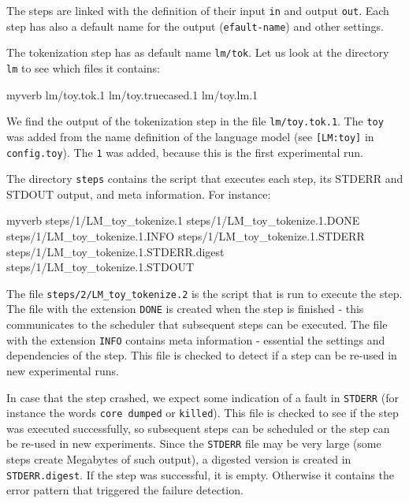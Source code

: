 The steps are linked with the definition of their input {\tt in} and output {\tt out}. Each step has also a default name for the output ({\tt efault-name}) and other settings.



The tokenization step has as default name {\tt lm/tok}. Let us look at the directory {\tt lm} to see which files it contains:






\begin{SaveVerbatim}{myverb}
 lm/toy.tok.1
 lm/toy.truecased.1
 lm/toy.lm.1
\end{SaveVerbatim}
\colorbox{gray}{%
}

We find the output of the tokenization step in the file {\tt lm/toy.tok.1}. The {\tt toy} was added from the name definition of the language model (see {\tt [LM:toy]} in {\tt config.toy}). The {\tt 1} was added, because this is the first experimental run.



The directory {\tt steps} contains the script that executes each step, its STDERR and STDOUT output, and meta information. For instance:






\begin{SaveVerbatim}{myverb}
 steps/1/LM_toy_tokenize.1
 steps/1/LM_toy_tokenize.1.DONE
 steps/1/LM_toy_tokenize.1.INFO
 steps/1/LM_toy_tokenize.1.STDERR
 steps/1/LM_toy_tokenize.1.STDERR.digest
 steps/1/LM_toy_tokenize.1.STDOUT
\end{SaveVerbatim}
\colorbox{gray}{%
}

The file {\tt steps/2/LM\_toy\_tokenize.2} is the script that is run to execute the step. The file with the extension {\tt DONE} is created when the step is finished - this communicates to the scheduler that subsequent steps can be executed. The file with the extension {\tt INFO} contains meta information - essential the settings and dependencies of the step. This file is checked to detect if a step can be re-used in new experimental runs.



In case that the step crashed, we expect some indication of a fault in {\tt STDERR} (for instance the words {\tt core dumped} or {\tt killed}). This file is checked to see if the step was executed successfully, so subsequent steps can be scheduled or the step can be re-used in new experiments. Since the {\tt STDERR} file may be very large (some steps create Megabytes of such output), a digested version is created in {\tt STDERR.digest}. If the step was successful, it is empty. Otherwise it contains the error pattern that triggered the failure detection.



